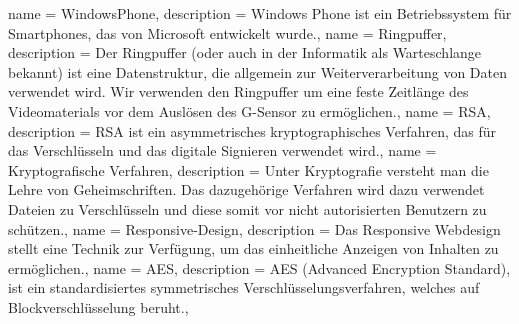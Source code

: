{
  name = WindowsPhone,
  description = {Windows Phone ist ein Betriebssystem für Smartphones, das von Microsoft entwickelt wurde.},
}
{
  name = Ringpuffer,
  description = {Der Ringpuffer (oder auch in der Informatik als Warteschlange bekannt) ist eine Datenstruktur, die allgemein zur Weiterverarbeitung von Daten verwendet wird. Wir verwenden den Ringpuffer um eine feste Zeitlänge des Videomaterials vor dem Auslösen des \gls{G-Sensor} zu ermöglichen.},
}
{
  name = RSA,
  description = {RSA ist ein asymmetrisches kryptographisches Verfahren, das für das Verschlüsseln und das digitale Signieren verwendet wird.},
}
{
  name = Kryptografische Verfahren,
  description = {Unter Kryptografie versteht man die Lehre von Geheimschriften. Das dazugehörige Verfahren wird dazu verwendet Dateien zu Verschlüsseln und diese somit vor nicht autorisierten Benutzern zu schützen.},
}
{
  name = Responsive-Design,
  description = {Das Responsive Webdesign stellt eine Technik zur Verfügung, um das einheitliche Anzeigen von Inhalten zu ermöglichen.},
}
{
  name = AES,
  description = {AES (Advanced Encryption Standard), ist ein standardisiertes symmetrisches Verschlüsselungsverfahren, welches auf Blockverschlüsselung beruht.},
}


